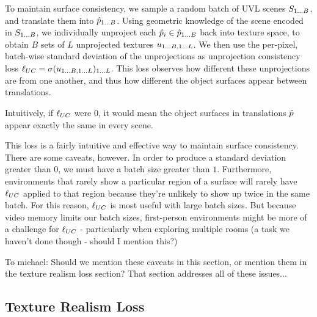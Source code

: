 \documentclass{article}
\begin{document}
To maintain surface consistency, we sample a random batch of UVL scenes $S_{1\dots B}$, and translate them into $\hat{p}_{1\dots B}$.
Using geometric knowledge of the scene encoded in $S_{1\dots B}$, we individually unproject each $\hat{p}_i \in \hat{p}_{1\dots B}$ back into texture space, to obtain $B$ sets of $L$ unprojected textures $u_{1\dots B, 1\dots L}$.
We then use the per-pixel, batch-wise standard deviation of the unprojections as unprojection consistency loss $\ell_{UC} = \sigma(u_{1\dots B, 1\dots L})_{1\dots L}$.
This loss observes how different these unprojections are from one another, and thus how different the object surfaces appear between translations. 

Intuitively, if $\ell_{UC}$ were $0$, it would mean the object surfaces in translations $\hat{p}$ appear exactly the same in every scene.

This loss is a fairly intuitive and effective way to maintain surface consistency. There are some caveats, however.
In order to produce a standard deviation greater than $0$, we must have a batch size greater than $1$.
Furthermore, environments that rarely show a particular region of a surface will rarely have $\ell_{UC}$ applied to that region because they're unlikely to show up twice in the same batch.
For this reason, $\ell_{UC}$ is most useful with large batch sizes.%
But because video memory limits our batch sizes, first-person environments might be more of a challenge for $\ell_{UC}$ - particularly when exploring multiple rooms (a task we haven't done though - should I mention this?)

To michael: Should we mention these caveats in this section, or mention them in the texture realism loss section? That section addresses all of these issues...
 

\subsection{Texture Realism Loss}
\label{sec:texture_realism_loss}
\end{document}
